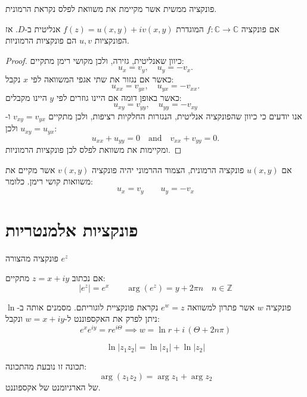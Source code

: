 \documentclass{tstextbook}
\begin{document}
\begin{definition}
פונקציה ממשית אשר מקיימת את משוואת לפלס נקראת הרמונית.

\end{definition}
\begin{theorem}
אם פונקציה \(f:\mathbb{C}\to \mathbb{C}\) המוגדרת \(f(z)=u(x,y)+iv(x,y)\) אנליטית ב-\(D\). אז הפונקציות \(u,v\) הם פונקציות הרמוניות.

\end{theorem}
\begin{proof}
כיוון שאנליטית, גזירה, ולכן מקושי רימן מתקיים:
$$u_{x}=v_{y},\quad u_{y}=-v_{x}.$$
כאשר אם נגזור את שתי אגפי המשוואה לפי \(x\) נקבל:
$$u_{x x}=v_{y x},\quad u_{y x}=-v_{x x}.$$
כאשר באופן דומה אם היינו גוזרים לפי \(y\) היינו מקבלים:
$$u_{x y}=v_{y y},\quad u_{y y}=-v_{x y}$$
אנו יודעים כי כיוון שהפונקציה אנליטית, הנגזרות החלקיות רציפות, ולכן מתקיים \(v_{xy}=v_{yx}\) ו-\(u_{xy}=u_{yx}\) ולכן:
$$u_{x x}+u_{y y}=0\quad{\mathrm{and}}\quad v_{x x}+v_{y y}=0.$$
ומקיימות את משוואת לפלס לכן פונקציות הרמוניות.

\end{proof}
\begin{definition}
אם \(u(x,y)\) פונקציה הרמונית, הצמוד ההרמוני יהיה פונקציה \(v(x,y)\) אשר מקיים את משוואות קושי רימן. כלומר:
$$u_{x}=v_{y}\qquad u_{y}=-v_{x}$$

\end{definition}

\section{פונקציות אלמנטריות}

\begin{definition}
פונקציה מהצורה \(e^z\)

\end{definition}
\begin{proposition}
אם נכתוב \(z=x+iy\) מתקיים:
$$\lvert e^z \rvert =e^x\qquad \arg(e^z)=y+2\pi n\quad n\in \mathbb{Z}$$

\end{proposition}
\begin{definition}
פונקציה \(w\) אשר פתרון למשוואה \(e^w=z\) נקראת פונקציית לוגוריתם. מסמנים אותה ב-\(\ln\) ניתן לפרק את האקספוננט ל-\(w=x+iy\) ונקבל:
$$e^xe^{iy}=re^{i\Theta} \implies w=\ln r+i\,\left( \Theta+2n\pi 
\right)$$

\end{definition}
\begin{proposition}
$$\ln|z_{1}z_{2}|=\ln|z_{1}|+\ln|z_{2}|$$

\end{proposition}
תכונה זו נובעת מהתכונה:
$$\arg(z_{1}z_{2})=\arg z_{1}+\arg z_{2}$$
של הארגיומנט של אקספוננט.
\end{document}
